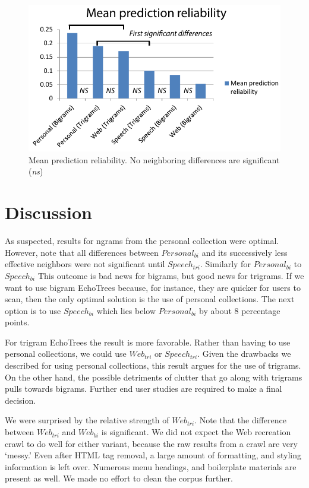 \documentclass{sigchi}
\begin{document}
\begin{figure}
   \centering
   \includegraphics[width=\columnwidth]{Figs/meanPrediction.pdf}
   \caption{Mean prediction reliability. No neighboring differences are
     significant ({\em ns})}
   \label{fig:reliability}
\end{figure}

\section{Discussion}

As suspected, results for ngrams from the personal collection were
optimal. However, note that all differences between $Personal_{bi}$
and its successively less effective neighbors were not significant
until $Speech_{tri}$. Similarly for $Personal_{bi}$ to $Speech_{bi}$
This outcome is bad news for bigrams, but good news for trigrams. If
we want to use bigram EchoTrees because, for instance, they are
quicker for users to scan, then the only optimal solution is the use
of personal collections. The next option is to use $Speech_{bi}$ which
lies below $Personal_{bi}$ by about 8 percentage points.

For trigram EchoTrees the result is more favorable. Rather than having
to use personal collections, we could use $Web_{tri}$ or
$Speech_{tri}$.  Given the drawbacks we described for using personal
collections, this result argues for the use of trigrams. On the other
hand, the possible detriments of clutter that go along with trigrams
pulls towards bigrams. Further end user studies are required to make a
final decision.

We were surprised by the relative strength of $Web_{tri}$. Note that
the difference between $Web_{tri}$ and $Web_{bi}$ is significant. We
did not expect the Web recreation crawl to do well for either variant,
because the raw results from a crawl are very `messy.' Even after HTML
tag removal, a large amount of formatting, and styling information is
left over. Numerous menu headings, and boilerplate materials are
present as well. We made no effort to clean the corpus further.
\end{document}
